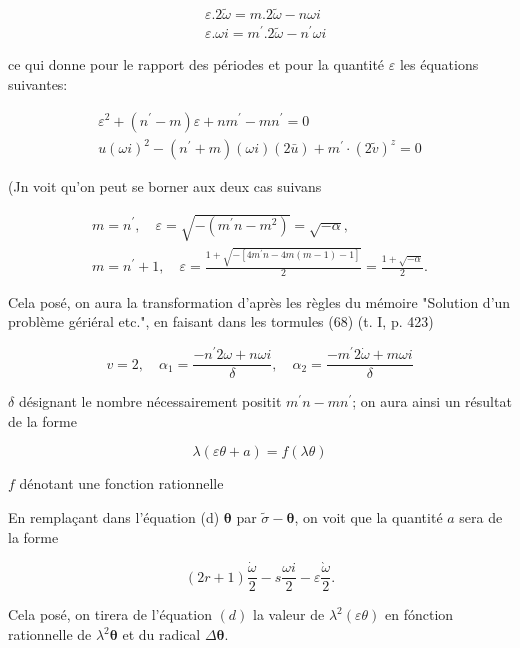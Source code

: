 \documentclass{article}
\begin{document}
\[
\begin{aligned}
& \varepsilon .2 \tilde{\omega}=m .2 \tilde{\omega}-n \omega i \\
& \varepsilon . \omega i=m^{\prime} .2 \widetilde{\omega}-n^{\prime} \omega i
\end{aligned}
\]

ce qui donne pour le rapport des périodes et pour la quantité \(\varepsilon\) les équations suivantes:

\[
\begin{gathered}
\varepsilon^{2}+\left(n^{\prime}-m\right) \varepsilon+n m^{\prime}-m n^{\prime}=0 \\
u(\omega i)^{2}-\left(n^{\prime}+m\right)(\omega i)(2 \bar{u})+m^{\prime} \cdot(2 \tilde{v})^{z}=0
\end{gathered}
\]

(Jn voit qu'on peut se borner aux deux cas suivans

\[
\begin{gathered}
m=n^{\prime}, \quad \varepsilon=\sqrt{-\left(m^{\prime} n-m^{2}\right)}=\sqrt{-\alpha}, \\
m=n^{\prime}+1, \quad \varepsilon=\frac{1+\sqrt{-\left[4 m^{\prime} n-4 m(m-1)-1\right]}}{2}=\frac{1+\sqrt{-\alpha}}{2} .
\end{gathered}
\]

Cela posé, on aura la transformation d'après les règles du mémoire "Solution d'un problème gériéral etc.", en faisant dans les tormules (68) (t. I, p. 423)

\[
v=2, \quad \alpha_{1}=\frac{-n^{\prime} 2 \omega+n \omega i}{\delta}, \quad \alpha_{2}=\frac{-m^{\prime} 2 \dot{\omega}+m \omega i}{\delta}
\]

\(\delta\) désignant le nombre nécessairement positit \(m^{\prime} n-m n^{\prime}\); on aura ainsi un résultat de la forme

\[
\lambda(\varepsilon \theta+a)=f(\lambda \theta)
\]

\(f\) dénotant une fonction rationnelle

En remplaçant dans l'équation (d) \(\boldsymbol{\theta}\) par \(\tilde{\sigma}-\boldsymbol{\theta}\), on voit que la quantité \(a\) sera de la forme

\[
(2 r+1) \frac{\dot{\omega}}{2}-s \frac{\omega i}{2}-\varepsilon \frac{\grave{\omega}}{2} .
\]

Cela posé, on tirera de l'équation \((d)\) la valeur de \(\lambda^{2}(\varepsilon \theta)\) en fónction rationnelle de \(\lambda^{2} \boldsymbol{\theta}\) et du radical \(\Delta \boldsymbol{\theta}\).
\end{document}
